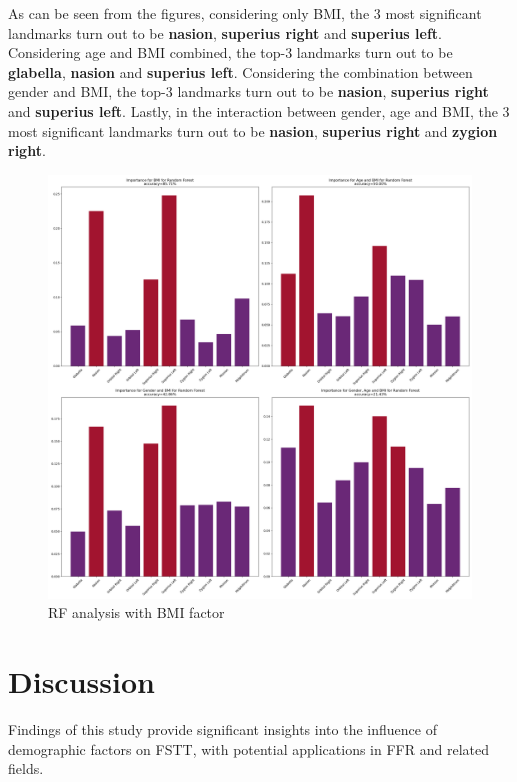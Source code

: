 \documentclass[journal,article,submit,pdftex,moreauthors]{Definitions/mdpi}
\begin{document}
As can be seen from the figures, considering only BMI, the 3 most significant landmarks turn out to be \textbf{nasion}, \textbf{superius right} and \textbf{superius left}. 
Considering age and BMI combined, the top-3 landmarks turn out to be \textbf{glabella}, \textbf{nasion} and \textbf{superius left}.
Considering the combination between gender and BMI, the top-3 landmarks turn out to be \textbf{nasion}, \textbf{superius right} and \textbf{superius left}.
Lastly, in the interaction between gender, age and BMI, the 3 most significant landmarks turn out to be \textbf{nasion}, \textbf{superius right} and \textbf{zygion right}.

\begin{figure}[H]
    \centering
    \includegraphics[width=0.75\linewidth]{Definitions/rf_bmi.png}
    \caption{RF analysis with BMI factor}
    \label{fig:fig10}
\end{figure}

\section{Discussion}
\label{sec:disc}

Findings of this study provide significant insights into the influence of demographic factors on FSTT, with potential applications in FFR and related fields. 
\end{document}
